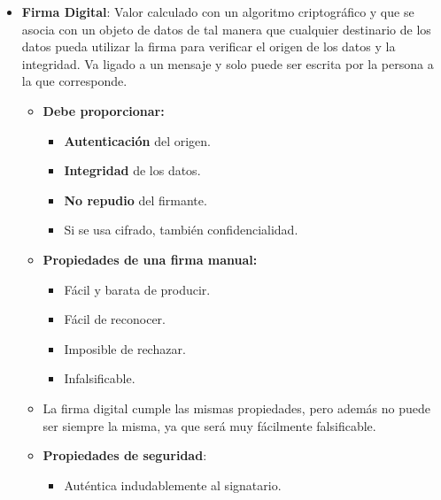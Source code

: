 \documentclass[12pt, twoside, openright]{report} %
\begin{document}
  \begin{itemize}
  \item \textbf{Firma Digital}: Valor calculado con un algoritmo
    criptográfico y que se asocia con un objeto de datos de tal manera
    que cualquier destinario de los datos pueda utilizar la firma para
    verificar el origen de los datos y la integridad. Va ligado a un
    mensaje y solo puede ser escrita por la persona a la que
    corresponde.
    

    \begin{itemize}
    \item \textbf{Debe proporcionar:}
      

      \begin{itemize}
      \item \textbf{Autenticación} del origen.
        
      \item \textbf{Integridad} de los datos.
        
      \item \textbf{No repudio} del firmante.
        
      \item Si se usa cifrado, también confidencialidad.
        
      \end{itemize}
    \item \textbf{Propiedades de una firma manual:}
      

      \begin{itemize}
      \item Fácil y barata de producir.
        
      \item Fácil de reconocer.
        
      \item Imposible de rechazar.
        
      \item Infalsificable.
        
      \end{itemize}
    \item La firma digital cumple las mismas propiedades, pero además no
      puede ser siempre la misma, ya que será muy fácilmente
      falsificable.
      
    \item \textbf{Propiedades de seguridad}:
      

      \begin{itemize}
      \item Auténtica indudablemente al signatario.
        

\end{itemize}
\end{itemize}
\end{itemize}
\end{document}
